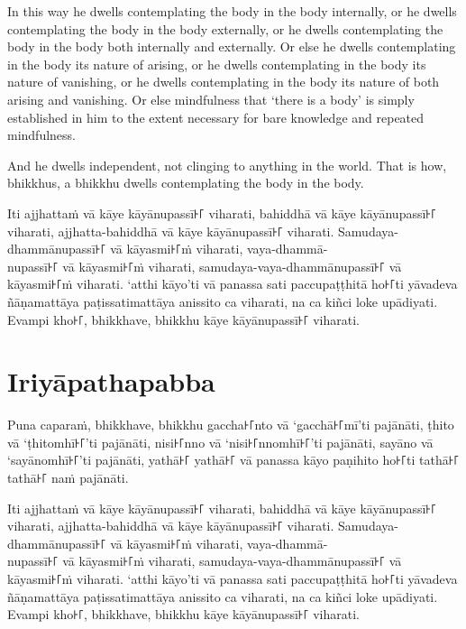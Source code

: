 In this way he dwells contemplating the body in the body internally, or he
dwells contemplating the body in the body externally, or he dwells contemplating
the body in the body both internally and externally. Or else he dwells
contemplating in the body its nature of arising, or he dwells contemplating in
the body its nature of vanishing, or he dwells contemplating in the body its
nature of both arising and vanishing. Or else mindfulness that ‘there is a body’
is simply established in him to the extent necessary for bare knowledge and
repeated mindfulness.

And he dwells independent, not clinging to anything in the world. That is how,
bhikkhus, a bhikkhu dwells contemplating the body in the body.


\paliPage

Iti ajjhattaṁ vā kāye kāyānupassī꜔꜒ viharati, bahiddhā vā kāye kāyānupassī꜔꜒
viharati, ajjhatta-bahiddhā vā kāye kāyānupassī꜔꜒ viharati. Samudaya-dhammānupassī꜔꜒
vā kāyasmi꜔꜒ṁ viharati, vaya-dhammā-\\
nupassī꜔꜒ vā kāyasmi꜔꜒ṁ viharati, samudaya-vaya-dhammānupassī꜔꜒ vā kāyasmi꜔꜒ṁ viharati.
‘atthi kāyo’ti vā panassa sati paccupaṭṭhitā ho꜔꜒ti yāvadeva ñāṇamattāya
paṭissatimattāya anissito ca viharati, na ca kiñci loke upādiyati. Evampi kho꜔꜒,
bhikkhave, bhikkhu kāye kāyānupassī꜔꜒ viharati.


\section*{Iriyāpathapabba}

Puna caparaṁ, bhikkhave, bhikkhu gaccha꜔꜒nto vā ‘gacchā꜔꜒mī’ti pajānāti, ṭhito vā
‘ṭhitomhī꜔꜒’ti pajānāti, nisi꜔꜒nno vā ‘nisi꜔꜒nnomhī꜔꜒’ti pajānāti, sayāno vā
‘sayānomhī꜔꜒’ti pajānāti, yathā꜔꜒ yathā꜔꜒ vā panassa kāyo paṇihito ho꜔꜒ti tathā꜔꜒ tathā꜔꜒
naṁ pajānāti.

Iti ajjhattaṁ vā kāye kāyānupassī꜔꜒ viharati, bahiddhā vā kāye kāyānupassī꜔꜒
viharati, ajjhatta-bahiddhā vā kāye kāyānupassī꜔꜒ viharati. Samudaya-dhammānupassī꜔꜒
vā kāyasmi꜔꜒ṁ viharati, vaya-dhammā-\\
nupassī꜔꜒ vā kāyasmi꜔꜒ṁ viharati, samudaya-vaya-dhammānupassī꜔꜒ vā kāyasmi꜔꜒ṁ viharati.
‘atthi kāyo’ti vā panassa sati paccupaṭṭhitā ho꜔꜒ti yāvadeva ñāṇamattāya
paṭissatimattāya anissito ca viharati, na ca kiñci loke upādiyati. Evampi kho꜔꜒,
bhikkhave, bhikkhu kāye kāyānupassī꜔꜒ viharati.

